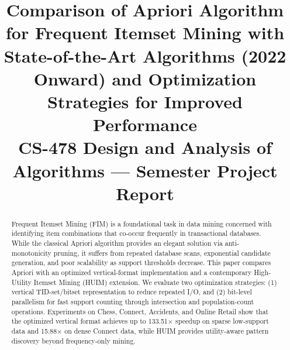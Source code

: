 \documentclass[conference]{IEEEtran}
\begin{document}
\title{Comparison of Apriori Algorithm for Frequent Itemset Mining with State-of-the-Art Algorithms (2022 Onward) and Optimization Strategies for Improved Performance\\
{\footnotesize CS-478 Design and Analysis of Algorithms --- Semester Project Report}}

\author{
\and
{}
\and
{}
\and
{}
}

\maketitle

\begin{abstract}
Frequent Itemset Mining (FIM) is a foundational task in data mining concerned with identifying item combinations that co-occur frequently in transactional databases. While the classical Apriori algorithm provides an elegant solution via anti-monotonicity pruning, it suffers from repeated database scans, exponential candidate generation, and poor scalability as support thresholds decrease. This paper compares Apriori with an optimized vertical-format implementation and a contemporary High-Utility Itemset Mining (HUIM) extension. We evaluate two optimization strategies: (1) vertical TID-set/bitset representation to reduce repeated I/O, and (2) bit-level parallelism for fast support counting through intersection and population-count operations. Experiments on Chess, Connect, Accidents, and Online Retail show that the optimized vertical format achieves up to 133.51$\times$ speedup on sparse low-support data and 15.88$\times$ on dense Connect data, while HUIM provides utility-aware pattern discovery beyond frequency-only mining.
\end{abstract}
\end{document}
